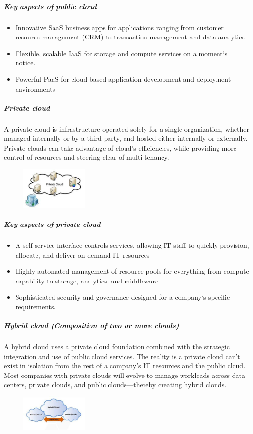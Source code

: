 \documentclass[11pt,a4paper]{report}
\begin{document}
\subparagraph*{Key aspects of public cloud}
\begin{itemize}
\item Innovative SaaS business apps for applications ranging from customer resource management (CRM) to transaction management and data analytics
\item Flexible, scalable IaaS for storage and compute services on a moment`s notice.

\item Powerful PaaS for cloud-based application 	development and deployment environments
\end{itemize}
\subparagraph*{Private cloud}
A private cloud is infrastructure operated solely for a single organization, whether managed internally or by a third party, and hosted either internally or externally. Private clouds can take advantage of cloud’s efficiencies, while providing more control of resources and steering clear of multi-tenancy.
\begin{figure}
\centering
\includegraphics[width=0.3\textwidth]{4.png}
\caption{\label{Private Cloud}}
\end{figure}
\subparagraph*{Key aspects of private cloud}
\begin{itemize}
\item A self-service interface controls services, allowing IT staff to quickly provision, allocate, and deliver on-demand IT resources
\item Highly automated management of resource pools for everything from compute capability to storage, analytics, and middleware
\item Sophisticated security and governance designed for a company`s specific requirements.
\end{itemize}
\subparagraph*{Hybrid cloud (Composition of two or more clouds)}
A hybrid cloud uses a private cloud foundation combined with the strategic integration and use of public cloud services. The reality is a private cloud can’t exist in isolation from the rest of a company’s IT resources and the public cloud. Most companies with private clouds will evolve to manage workloads across data centers, private clouds, and public clouds—thereby creating hybrid clouds.
\begin{figure}
\centering
\includegraphics[width=0.3\textwidth]{2.jpg}
\caption{\label{Hybird Cloud}}
\end{figure}
\end{document}
